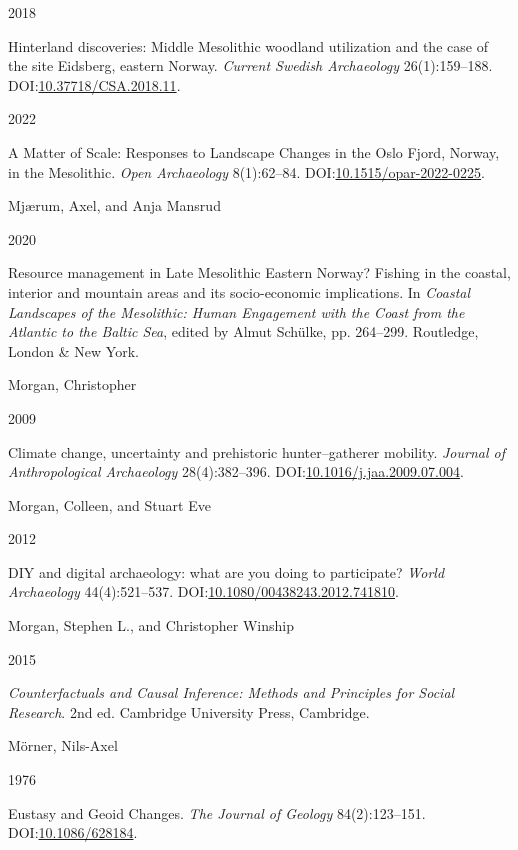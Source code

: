 \documentclass[
  12pt,
  a4paper,
  oneside]{book}
\newlength{\cslhangindent}
\newlength{\csllabelwidth}
\newlength{\cslentryspacingunit} %
\newenvironment{CSLReferences}[2] %
 {%
  \setlength{\parindent}{0pt}
  \ifodd #1
  \let\oldpar\par
  \def\par{\hangindent=\cslhangindent\oldpar}
  \fi
  \setlength{\parskip}{#2\cslentryspacingunit}
 }%
 {}
\newcommand{\CSLBlock}[1]{#1\hfill\break}
\newcommand{\CSLLeftMargin}[1]{\parbox[t]{\csllabelwidth}{#1}}
\newcommand{\CSLRightInline}[1]{\parbox[t]{\linewidth - \csllabelwidth}{#1}\break}
\begin{document}
\begin{CSLReferences}{0}{0}
\leavevmode{}%
\CSLLeftMargin{ 2018 }%
\CSLRightInline{Hinterland discoveries: Middle Mesolithic woodland utilization and the case of the site Eidsberg, eastern Norway. \emph{Current Swedish Archaeology} 26(1):159--188. DOI:\href{https://doi.org/10.37718/CSA.2018.11}{10.37718/CSA.2018.11}.}

\leavevmode{}%
\CSLLeftMargin{ 2022 }%
\CSLRightInline{{A Matter of Scale: Responses to Landscape Changes in the Oslo Fjord, Norway, in the Mesolithic}. \emph{Open Archaeology} 8(1):62--84. DOI:\href{https://doi.org/10.1515/opar-2022-0225}{10.1515/opar-2022-0225}.}

\leavevmode{}%
\CSLBlock{Mjærum, Axel, and Anja Mansrud}
\CSLLeftMargin{ 2020}%
\CSLRightInline{{Resource management in Late Mesolithic Eastern Norway? Fishing in the coastal, interior and mountain areas and its socio-economic implications}. In \emph{{Coastal Landscapes of the Mesolithic: Human Engagement with the Coast from the Atlantic to the Baltic Sea}}, edited by Almut Schülke, pp. 264--299. Routledge, London \& New York.}

\leavevmode{}%
\CSLBlock{Morgan, Christopher}
\CSLLeftMargin{ 2009}%
\CSLRightInline{Climate change, uncertainty and prehistoric hunter--gatherer mobility. \emph{Journal of Anthropological Archaeology} 28(4):382--396. DOI:\href{https://doi.org/10.1016/j.jaa.2009.07.004}{10.1016/j.jaa.2009.07.004}.}

\leavevmode{}%
\CSLBlock{Morgan, Colleen, and Stuart Eve}
\CSLLeftMargin{ 2012}%
\CSLRightInline{{DIY and digital archaeology: what are you doing to participate?} \emph{World Archaeology} 44(4):521--537. DOI:\href{https://doi.org/10.1080/00438243.2012.741810}{10.1080/00438243.2012.741810}.}

\leavevmode{}%
\CSLBlock{Morgan, Stephen L., and Christopher Winship}
\CSLLeftMargin{ 2015}%
\CSLRightInline{\emph{{Counterfactuals and Causal Inference: Methods and Principles for Social Research}}. 2nd ed. Cambridge University Press, Cambridge.}

\leavevmode{}%
\CSLBlock{Mörner, Nils-Axel}
\CSLLeftMargin{ 1976}%
\CSLRightInline{{Eustasy and Geoid Changes}. \emph{The Journal of Geology} 84(2):123--151. DOI:\href{https://doi.org/10.1086/628184}{10.1086/628184}.}


\end{CSLReferences}
\end{document}

